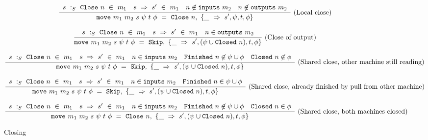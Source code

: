 \begin{figure*}

$$
\ruleI
{
    \arrLCCR
        { \CheckStateTypeM{m_1}{s}{\Close{n}} }
        { \TransUM{s}{s'}{m_1} }
        { n \not\in \inputs{m_2} }
        { n \not\in \outputs{m_2} }
}
{
    \MoveOut
        {\sptp}
        {\Close{n}}
        {\MoveTU{s',\psi, t, \phi}}
}
\textrm{(Local close)}
$$

$$
\ruleI
{
    \arrLCR
        { \CheckStateTypeM{m_1}{s}{\Close{n}} }
        { \TransUM{s}{s'}{m_1} }
        { n \in \outputs{m_2} }
}
{
    \MoveOut
        {\sptp}
        {\Skip}
        {\MoveTU{s',(\psi \cup \Closed{n}), t, \phi}}
}
\textrm{(Close of output)}
$$


$$
\ruleI
{
    \arrLCCCR
        { \CheckStateTypeM{m_1}{s}{\Close{n}} }
        { \TransUM{s}{s'}{m_1} }
        { n \in \inputs{m_2} }
        { \Finished{n} \not\in \psi \cup \phi }
        { \Closed{n} \not\in \phi             }
}
{
    \MoveOut
        {\sptp}
        {\Skip}
        {\MoveTU{s',(\psi \cup \Closed{n}), t, \phi}}
}
\textrm{(Shared close, other machine still reading)}
$$

$$
\ruleI
{
    \arrLCCR
        { \CheckStateTypeM{m_1}{s}{\Close{n}} }
        { \TransUM{s}{s'}{m_1} }
        { n \in \inputs{m_2} }
        { \Finished{n} \in \psi \cup \phi }
}
{
    \MoveOut
        {\sptp}
        {\Skip}
        {\MoveTU{s',(\psi \cup \Closed{n}), t, \phi}}
}
\textrm{(Shared close, already finished by pull from other machine)}
$$

$$
\ruleI
{
    \arrLCCCR
        { \CheckStateTypeM{m_1}{s}{\Close{n}} }
        { \TransUM{s}{s'}{m_1} }
        { n \in \inputs{m_2} }
        { \Finished{n} \not\in \psi \cup \phi }
        { \Closed{n} \in \phi             }
}
{
    \MoveOut
        {\sptp}
        {\Close{n}}
        {\MoveTU{s',(\psi \cup \Closed{n}), t, \phi}}
}
\textrm{(Shared close, both machines closed)}
$$


\caption{Closing}
\label{fig:merge:gen:noninter}
\end{figure*}

